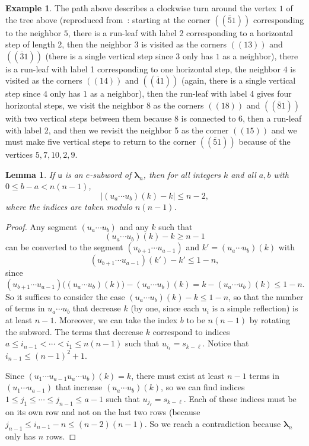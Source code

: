 \documentclass[a4paper,10pt,leqno]{amsart}
\numberwithin{equation}{section}
\newtheorem{lemma}[theorem]{Lemma}
\theoremstyle{definition}
\newtheorem{example}[theorem]{Example}
\theoremstyle{remark}
\renewcommand{\u}{\mathsf{u}}
\newcommand{\rr}{\mathsf{r}}
\newcommand{\rru}{\rr^\u}
\newcommand{\blambda}{\bm{\lambda}}
\newcounter{intege}
\begin{document}
\begin{example}
The path above describes a clockwise turn around the vertex $1$ of the tree above (reproduced from~: starting at the corner $(\!(\overline{5}1)\!)$ corresponding to the neighbor $5$, there is a run-leaf with label 2 corresponding to a horizontal step of length 2, then the neighbor $3$ is visited as the corners $(\!(13)\!)$ and $(\!(\overline{3}1)\!)$ (there is a single vertical step since $3$ only has $1$ as a neighbor), there is a run-leaf with label 1 corresponding to one horizontal step,  the neighbor $4$ is visited as the corners $(\!(14)\!)$ and $(\!(\overline{4}1)\!)$ (again, there is a single vertical step since $4$ only has $1$ as a neighbor), then the run-leaf with label 4 gives four horizontal steps, we visit the neighbor $8$ as the corners $(\!(18)\!)$ and $(\!(\overline{8}1)\!)$ with two vertical steps between them because $8$ is connected to $6$, then a run-leaf with label 2, and then we revisit the neighbor 5 as the corner $(\!(15)\!)$ and we must make five vertical steps to return to the corner $(\!(\overline{5}1)\!)$ because of the vertices $5,7,10,2,9$. 
\end{example}



\begin{lemma}
\label{maxDist}
    If $\u$ is an $e$-subword of $\blambda_n$, then for all integers $k$ and all $a, b$ with $0 \leq b - a < n(n-1)$,
    \[
        \big|\left(u_{a}\cdots u_{b}\right)(k) - k\big| \leq n-2,
    \]
    where the indices are taken modulo $n(n-1)$.
\end{lemma}
\begin{proof}

Any segment $\left(u_a\cdots u_{b}\right)$ and any $k$ such that \[\left(u_a\cdots u_{b}\right)(k) - k \geq n-1\] can be converted to the segment $\left(u_{b+1}\cdots u_{a-1}\right)$ and $k'=\left(u_a \cdots u_b\right)(k)$ with \[\left(u_{b+1}\cdots u_{a-1}\right)(k') - k' \leq 1-n,\] since
    \[
        \left(u_{b+1}\cdots u_{a-1}\right)\big(\left(u_a \cdots u_b\right)(k)\big) - \left(u_a \cdots u_b\right)(k) = k - \left(u_a \cdots u_b\right)(k) \leq 1-n.
    \]
    So it suffices to consider the case $\left(u_a\cdots u_{b}\right)(k) - k \leq 1-n$, so that the number of terms in $u_a\cdots u_{b}$ that decrease $k$ (by one, since each $u_i$ is a simple reflection) is at least $n-1$.    Moreover, we can take the index $b$ to be $n(n-1)$ by rotating the subword.  The terms that decrease $k$ correspond to indices $a \leq i_{n-1} < \cdots < i_1 \leq n(n-1)$ such that $u_{i_\ell} = s_{k - \ell}$. Notice that $i_{n-1} \leq (n-1)^2 + 1$.
    
    Since $\left(u_1 \cdots u_{a-1}u_a\cdots u_{b}\right)(k) = k$, there must exist at least $n-1$ terms in $(u_1\cdots u_{a-1})$ that increase $(u_a \cdots u_b)(k)$, so we can find indices $1 \leq j_1 \leq \cdots \leq j_{n-1} \leq a-1$ such that $u_{j_\ell} = s_{k-\ell}$. Each of these indices must be on its own row and not on the last two rows (because $j_{n-1} \leq i_{n-1} - n \leq (n-2)(n-1)$. So we reach a contradiction because $\blambda_n$ only has $n$ rows.
\end{proof}
\end{document}
